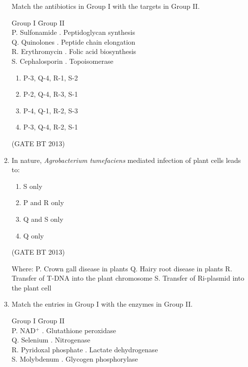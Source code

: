 \documentclass[journal,12pt,onecolumn]{IEEEtran}
\theoremstyle{remark}
\begin{document}
\begin{enumerate}
Match the antibiotics in Group I with the targets in Group II.

\begin{tabbing}
Group I \hspace{3.5cm} \= Group II \\
P. Sulfonamide . Peptidoglycan synthesis \\
Q. Quinolones . Peptide chain elongation \\
R. Erythromycin . Folic acid biosynthesis \\
S. Cephalosporin . Topoisomerase \\
\end{tabbing}

\begin{enumerate}
    \item P-3, Q-4, R-1, S-2
    \item P-2, Q-4, R-3, S-1
    \item P-4, Q-1, R-2, S-3
    \item P-3, Q-4, R-2, S-1
\end{enumerate} \hfill(GATE BT 2013)

\item 

In nature, \textit{Agrobacterium tumefaciens} mediated infection of plant cells leads to:

\begin{enumerate}
    \item S only
    \item P and R only
    \item Q and S only
    \item Q only
\end{enumerate} \hfill(GATE BT 2013)

Where:  
P. Crown gall disease in plants  
Q. Hairy root disease in plants  
R. Transfer of T-DNA into the plant chromosome  
S. Transfer of Ri-plasmid into the plant cell
\item 

Match the entries in Group I with the enzymes in Group II.

\begin{tabbing}
Group I \hspace{3.5cm} \= Group II \\
P. NAD$^+$ . Glutathione peroxidase \\
Q. Selenium . Nitrogenase \\
R. Pyridoxal phosphate . Lactate dehydrogenase \\
S. Molybdenum . Glycogen phosphorylase \\
\end{tabbing}


\end{enumerate}
\end{document}
